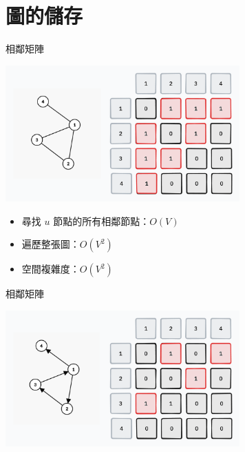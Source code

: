 \documentclass[mathserif]{beamer}
\begin{document}
\section{圖的儲存}

\begin{frame}{相鄰矩陣}
    \begin{center}
        \includegraphics[width=9.0cm]{img/graph-1.png}
    \end{center}
    \begin{itemize}
        \item 尋找 $u$ 節點的所有相鄰節點：$O(V)$
        \item 遍歷整張圖：$O(V^2)$
        \item 空間複雜度：$O(V^2)$
    \end{itemize}
\end{frame}

\begin{frame}{相鄰矩陣}
    \begin{center}
        \includegraphics[width=9.0cm]{img/graph-2.png}
    \end{center}
\end{frame}
\end{document}
